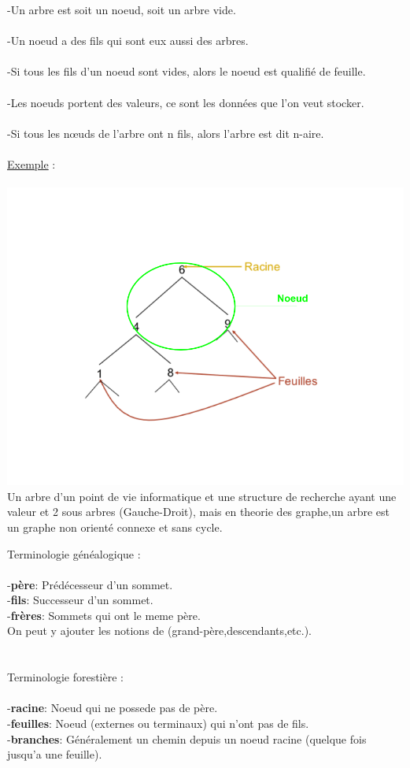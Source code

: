 \documentclass[a4paper,12pt,openany]{book}
\begin{document}
-Un arbre est soit un noeud, soit un arbre vide.\\
\\
-Un noeud a des fils qui sont eux aussi des arbres.\\
\\
-Si tous les fils d’un noeud sont vides, alors le noeud est
qualifié de feuille.\\
\\
-Les noeuds portent des valeurs, ce sont les données que
l’on veut stocker.\\
\\
-Si tous les nœuds de l’arbre ont n fils, alors l’arbre est
dit n-aire.\\
\\
\underline{Exemple} : \\
\\
\includegraphics[width=1\linewidth,center]{img/definition_arbre.png}
\\
Un arbre d'un point de vie informatique et une structure de recherche ayant une valeur et 2 sous arbres (Gauche-Droit), mais en theorie des graphe,un arbre est un graphe non orienté connexe et sans cycle.\\


Terminologie généalogique : \\
\\
-\textbf{père}: Prédécesseur d'un sommet.\\
-\textbf{fils}: Successeur d'un sommet.\\
-\textbf{frères}: Sommets qui ont le meme père.\\
On peut y ajouter les notions de (grand-père,descendants,etc.).\\
\\
\\
Terminologie forestière :\\
\\
-\textbf{racine}: Noeud qui ne possede pas de père.\\
-\textbf{feuilles}: Noeud (externes ou terminaux) qui n'ont pas de fils.\\
-\textbf{branches}: Généralement un chemin depuis un noeud racine (quelque fois jusqu'a une feuille).\\
\end{document}

